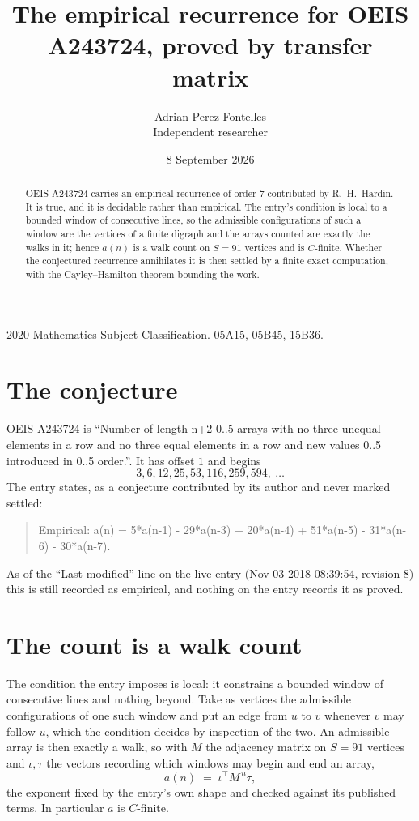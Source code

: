 \documentclass[11pt,a4paper]{article}
\title{The empirical recurrence for OEIS A243724, proved by transfer matrix}
\author{Adrian Perez Fontelles\\ \small Independent researcher}
\date{8 September 2026}
\theoremstyle{plain}
\theoremstyle{definition}
\begin{document}
\maketitle

\begin{abstract}
OEIS A243724 carries an empirical recurrence of order $7$ contributed by R.~H.~Hardin. It is
true, and it is decidable rather than empirical. The entry's condition is local to a bounded window of consecutive lines, so
the admissible configurations of such a window are the vertices of a finite digraph and the
arrays counted are exactly the walks in it; hence $a(n)$ is a walk count on $S=91$ vertices
and is $C$-finite. Whether the conjectured recurrence annihilates it is then settled by a
finite exact computation, with the Cayley--Hamilton theorem bounding the work.
\end{abstract}

\noindent\small 2020 Mathematics Subject Classification. 05A15, 05B45, 15B36.\normalsize

\section{The conjecture}

OEIS A243724 is ``Number of length n+2 0..5 arrays with no three unequal elements in a row and no three equal elements in a row and new values 0..5 introduced in 0..5 order.''. It has offset $1$ and begins
\[
3, 6, 12, 25, 53, 116, 259, 594,\ \dots
\]
The entry states, as a conjecture contributed by its author and never marked settled:
\begin{quote}
Empirical: a(n) = 5*a(n-1) - 29*a(n-3) + 20*a(n-4) + 51*a(n-5) - 31*a(n-6) - 30*a(n-7).
\end{quote}
As of the ``Last modified'' line on the live entry (Nov 03 2018 08:39:54, revision 8) this is still
recorded as empirical, and nothing on the entry records it as proved.

\section{The count is a walk count}

The condition the entry imposes is local: it constrains a bounded window of consecutive lines and nothing beyond. Take as
vertices the admissible configurations of one such window and put an edge from $u$ to $v$
whenever $v$ may follow $u$, which the condition decides by inspection of the two. An
admissible array is then exactly a walk, so with $M$ the adjacency matrix on $S=91$ vertices
and $\iota,\tau$ the vectors recording which windows may begin and end an array,
\[
a(n)\;=\;\iota^{\!\top}M^{\,n}\tau ,
\]
the exponent fixed by the entry's own shape and checked against its published terms. In
particular $a$ is $C$-finite.
\end{document}

